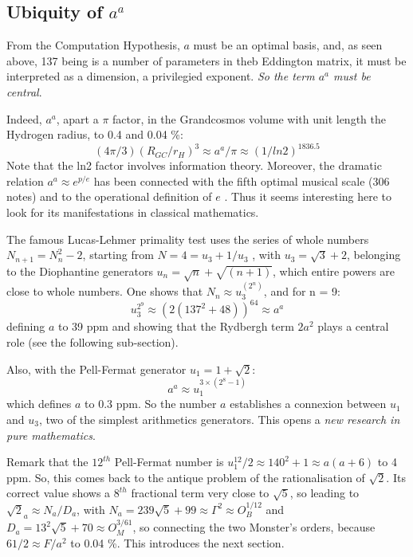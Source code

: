 \documentclass[twoside,draft]{article}
\begin{document}
\begin{sloppypar}
\subsection{Ubiquity of $a^{a}$}

From the Computation Hypothesis, $a$ must be an optimal basis, and, as seen above, 137 being is a number of parameters in theb Eddington matrix, it must be interpreted as a dimension, a privilegied exponent. \textit{So the term $a^a$ must be central}.
    
Indeed, $a^a$, apart a $\pi$ factor, in the Grandcosmos volume with unit length the Hydrogen radius, to 0.4 and 0.04 \%:
\begin{equation}
(4\pi/3)(R_{GC}/r_H)^3 \approx a^a/\pi \approx (1/ln2)^{1836.5}
\end{equation}
Note that the ln2 factor involves information theory.
Moreover, the dramatic relation $a^a\approx e^{p/e}$ has been connected with the fifth optimal musical scale (306 notes) and to the operational definition of $e$ \cite{Sanchez1}. Thus it seems interesting here to look for its manifestations in classical mathematics. 

The famous Lucas-Lehmer primality test uses the series of whole numbers $N_{n+1} = N_{n}^{2}-2$,
starting from $N = 4 = u_{3} + 1/u_{3}$ , with $u_{3} = \sqrt{3} + 2$, belonging to the Diophantine generators $u_{n} = \sqrt{n} + \sqrt{(n+1)}$, which entire powers are close to whole numbers. One shows that $N_{n} \approx u_{3}^{(2^{n})}$, and for n = 9:
\begin{equation}
u_{3}^{2^9} \approx (2(137^{2} + 48))^{64} \approx a^{a}
\end{equation}
defining $a$ to 39 ppm and showing that the Rydbergh term $2a^2$ plays a central role (see the following sub-section).

Also, with the Pell-Fermat generator $u_{1} = 1 + \sqrt{2}$:
\begin{equation}
a^{a} \approx u_1^{3\times(2^{8}-1)}
\end{equation}
which defines $a$ to 0.3 ppm. So the number $a$ establishes a connexion between $u_{1}$ and $u_{3}$, two of the
simplest arithmetics generators. This opens a \textit{new research in pure mathematics}.

Remark that the $12^{th}$ Pell-Fermat number is $ u_1^{12}/2 \approx 140^2 + 1 \approx a(a+6)$ to 4 ppm. So, this comes back to the antique problem of the rationalisation of $\sqrt{2}$. Its correct value shows a $8^{th}$ fractional term very close to $\sqrt{5}$, so leading to $\sqrt{2}_a \approx N_{a}/D_{a}$, with $ N_{a} = 239 \sqrt{5} + 99 \approx \Gamma^{2}
\approx O_B^{1/12} $ and $ D_{a} = 13^2 \sqrt{5} + 70 \approx O_M^{3/61}$,
so connecting the two Monster's orders, because $61/2 \approx F/a^{2}$ to 0.04 \%.
This introduces the next section.


\end{sloppypar}
\end{document}
